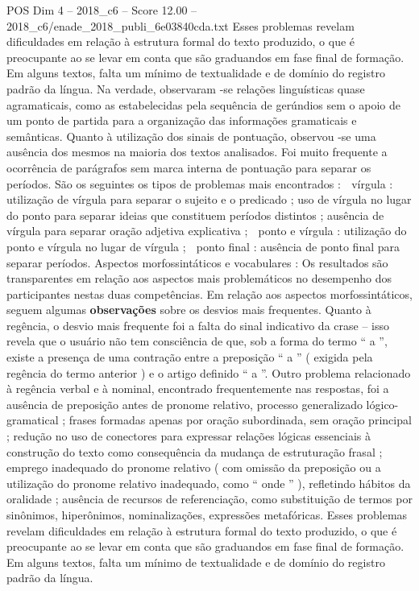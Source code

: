 \begin{textsample}{POS Dim 4 – 2018\_c6 – Score 12.00 – 2018\_c6/enade\_2018\_publi\_6e03840cda.txt}
Esses problemas revelam dificuldades em relação à estrutura formal do texto produzido, o que é preocupante ao se levar em conta que são graduandos em fase final de formação.
Em alguns textos, falta um mínimo de textualidade e de domínio do registro padrão da língua.
Na verdade, observaram -se relações linguísticas quase agramaticais, como as estabelecidas pela sequência de gerúndios sem o apoio de um ponto de partida para a organização das informações gramaticais e semânticas.
Quanto à utilização dos sinais de pontuação, observou -se uma ausência dos mesmos na maioria dos textos analisados.
Foi muito frequente a ocorrência de parágrafos sem marca interna de pontuação para separar os períodos.
São os seguintes os tipos de problemas mais encontrados :  vírgula : utilização de vírgula para separar o sujeito e o predicado ; uso de vírgula no lugar do ponto para separar ideias que constituem períodos distintos ; ausência de vírgula para separar oração adjetiva explicativa ;  ponto e vírgula : utilização do ponto e vírgula no lugar de vírgula ;  ponto final : ausência de ponto final para separar períodos.
Aspectos morfossintáticos e vocabulares : Os resultados são transparentes em relação aos aspectos mais problemáticos no desempenho dos participantes nestas duas competências.
Em relação aos aspectos morfossintáticos, seguem algumas \textbf{observações} sobre os desvios mais frequentes.
Quanto à regência, o desvio mais frequente foi a falta do sinal indicativo da crase – isso revela que o usuário não tem consciência de que, sob a forma do termo “ a ”, existe a presença de uma contração entre a preposição “ a ” ( exigida pela regência do termo anterior ) e o artigo definido “ a ”.
Outro problema relacionado à regência verbal e à nominal, encontrado frequentemente nas respostas, foi a ausência de preposição antes de pronome relativo, processo generalizado lógico-gramatical ; frases formadas apenas por oração subordinada, sem oração principal ; redução no uso de conectores para expressar relações lógicas essenciais à construção do texto como consequência da mudança de estruturação frasal ; emprego inadequado do pronome relativo ( com omissão da preposição ou a utilização do pronome relativo inadequado, como “ onde ” ), refletindo hábitos da oralidade ; ausência de recursos de referenciação, como substituição de termos por sinônimos, hiperônimos, nominalizações, expressões metafóricas.
Esses problemas revelam dificuldades em relação à estrutura formal do texto produzido, o que é preocupante ao se levar em conta que são graduandos em fase final de formação.
Em alguns textos, falta um mínimo de textualidade e de domínio do registro padrão da língua.

\end{textsample}
